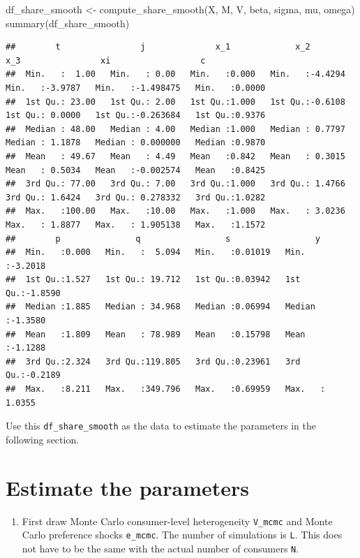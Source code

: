 \documentclass[
]{book}
\newenvironment{Shaded}{\begin{snugshade}}{\end{snugshade}}
\newcommand{\FunctionTok}[1]{\textcolor[rgb]{0.00,0.00,0.00}{#1}}
\newcommand{\NormalTok}[1]{#1}
\newcommand{\OtherTok}[1]{\textcolor[rgb]{0.56,0.35,0.01}{#1}}
\providecommand{\tightlist}{%
  \setlength{\itemsep}{0pt}\setlength{\parskip}{0pt}}
\begin{document}
\begin{Shaded}
\begin{Highlighting}[]
\NormalTok{df\_share\_smooth }\OtherTok{\textless{}{-}} \FunctionTok{compute\_share\_smooth}\NormalTok{(X, M, V, beta, sigma, mu, omega)}
\FunctionTok{summary}\NormalTok{(df\_share\_smooth)}
\end{Highlighting}
\end{Shaded}

\begin{verbatim}
##        t                j              x_1             x_2               x_3                xi                  c         
##  Min.   :  1.00   Min.   : 0.00   Min.   :0.000   Min.   :-4.4294   Min.   :-3.9787   Min.   :-1.498475   Min.   :0.0000  
##  1st Qu.: 23.00   1st Qu.: 2.00   1st Qu.:1.000   1st Qu.:-0.6108   1st Qu.: 0.0000   1st Qu.:-0.263684   1st Qu.:0.9376  
##  Median : 48.00   Median : 4.00   Median :1.000   Median : 0.7797   Median : 1.1878   Median : 0.000000   Median :0.9870  
##  Mean   : 49.67   Mean   : 4.49   Mean   :0.842   Mean   : 0.3015   Mean   : 0.5034   Mean   :-0.002574   Mean   :0.8425  
##  3rd Qu.: 77.00   3rd Qu.: 7.00   3rd Qu.:1.000   3rd Qu.: 1.4766   3rd Qu.: 1.6424   3rd Qu.: 0.278332   3rd Qu.:1.0282  
##  Max.   :100.00   Max.   :10.00   Max.   :1.000   Max.   : 3.0236   Max.   : 1.8877   Max.   : 1.905138   Max.   :1.1572  
##        p               q                 s                 y          
##  Min.   :0.000   Min.   :  5.094   Min.   :0.01019   Min.   :-3.2018  
##  1st Qu.:1.527   1st Qu.: 19.712   1st Qu.:0.03942   1st Qu.:-1.8590  
##  Median :1.885   Median : 34.968   Median :0.06994   Median :-1.3580  
##  Mean   :1.809   Mean   : 78.989   Mean   :0.15798   Mean   :-1.1288  
##  3rd Qu.:2.324   3rd Qu.:119.805   3rd Qu.:0.23961   3rd Qu.:-0.2189  
##  Max.   :8.211   Max.   :349.796   Max.   :0.69959   Max.   : 1.0355
\end{verbatim}

Use this \texttt{df\_share\_smooth} as the data to estimate the parameters in the following section.

\hypertarget{estimate-the-parameters-2}{%
\section{Estimate the parameters}\label{estimate-the-parameters-2}}

\begin{enumerate}
\def\labelenumi{\arabic{enumi}.}
\tightlist
\item
  First draw Monte Carlo consumer-level heterogeneity \texttt{V\_mcmc} and Monte Carlo preference shocks \texttt{e\_mcmc}. The number of simulations is \texttt{L}. This does not have to be the same with the actual number of consumers \texttt{N}.
\end{enumerate}
\end{document}

